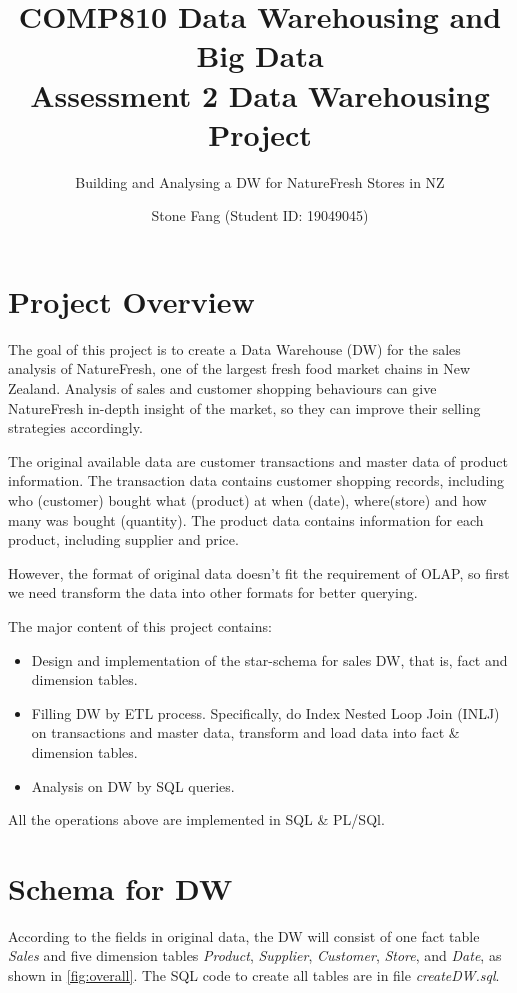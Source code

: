 \documentclass[
  a4paper,
]{article}
\title{    \textbf{COMP810 Data Warehousing and Big Data \\
    Assessment 2 Data Warehousing Project}}
\subtitle{Building and Analysing a DW for NatureFresh Stores in NZ}
\author{Stone Fang (Student ID: 19049045)}
\date{}
\providecommand{\tightlist}{%
  \setlength{\itemsep}{0pt}\setlength{\parskip}{0pt}}
\begin{document}
\maketitle

\hypertarget{project-overview}{%
\section{Project Overview}\label{project-overview}}

The goal of this project is to create a Data Warehouse (DW) for the
sales analysis of NatureFresh, one of the largest fresh food market
chains in New Zealand. Analysis of sales and customer shopping
behaviours can give NatureFresh in-depth insight of the market, so they
can improve their selling strategies accordingly.

The original available data are customer transactions and master data of
product information. The transaction data contains customer shopping
records, including who (customer) bought what (product) at when (date),
where(store) and how many was bought (quantity). The product data
contains information for each product, including supplier and price.

However, the format of original data doesn't fit the requirement of
OLAP, so first we need transform the data into other formats for better
querying.

The major content of this project contains:

\begin{itemize}
\tightlist
\item
  Design and implementation of the star-schema for sales DW, that is,
  fact and dimension tables.
\item
  Filling DW by ETL process. Specifically, do Index Nested Loop Join
  (INLJ) on transactions and master data, transform and load data into
  fact \& dimension tables.
\item
  Analysis on DW by SQL queries.
\end{itemize}

All the operations above are implemented in SQL \& PL/SQl.

\hypertarget{schema-for-dw}{%
\section{Schema for DW}\label{schema-for-dw}}

According to the fields in original data, the DW will consist of one
fact table \emph{Sales} and five dimension tables \emph{Product},
\emph{Supplier}, \emph{Customer}, \emph{Store}, and \emph{Date}, as
shown in \cref{fig:overall}. The SQL code to create all tables are in
file \emph{createDW.sql}.
\end{document}

